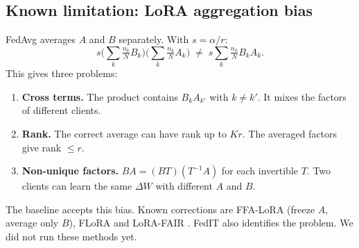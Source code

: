 \subsection{Known limitation: LoRA aggregation bias}\label{sec:bias}
FedAvg averages $A$ and $B$ separately. With $s=\alpha/r$:
\begin{equation}\label{eq:bias}
s\Big(\sum_k\tfrac{n_k}{N}B_k\Big)\Big(\sum_k\tfrac{n_k}{N}A_k\Big)\;\neq\;s\sum_k\tfrac{n_k}{N}B_kA_k .
\end{equation}
This gives three problems:
\begin{enumerate}[label=(\alph*)]
  \item \textbf{Cross terms.} The product contains $B_kA_{k'}$ with $k\neq k'$. It mixes the factors of different clients.
  \item \textbf{Rank.} The correct average can have rank up to $Kr$. The averaged factors give rank $\le r$.
  \item \textbf{Non-unique factors.} $BA=(BT)(T^{-1}A)$ for each invertible $T$. Two clients can learn the same $\Delta W$ with different $A$ and $B$.
\end{enumerate}
The baseline accepts this bias. Known corrections are FFA-LoRA \citep{sun2024improvingloraprivacypreservingfederated} (freeze $A$, average only $B$), FLoRA \citep{wang2024florafederatedfinetuninglarge} and LoRA-FAIR \citep{bian2025lorafairfederatedlorafinetuning}. FedIT \citep{zhang2024buildingfederatedgptfederated} also identifies the problem. We did not run these methods yet.

